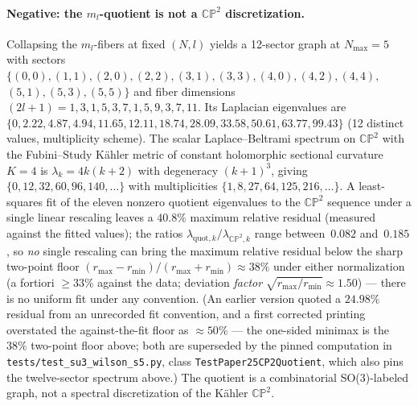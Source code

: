 \documentclass[aps,pra,twocolumn,superscriptaddress,longbibliography]{revtex4-2}
\begin{document}
\paragraph*{Negative: the $m_l$-quotient is not a $\mathbb{CP}^2$
discretization.} Collapsing the $m_l$-fibers at fixed $(N, l)$
yields a 12-sector graph at $N_{\max} = 5$ with sectors
$\{(0,0), (1,1), (2,0), (2,2), (3,1), (3,3), (4,0), (4,2), (4,4),$
$(5,1), (5,3), (5,5)\}$ and fiber dimensions $(2l+1) = 1, 3, 1, 5,
3, 7, 1, 5, 9, 3, 7, 11$.  Its Laplacian eigenvalues are
$\{0, 2.22, 4.87, 4.94, 11.65, 12.11, 18.74, 28.09, 33.58, 50.61,
63.77, 99.43\}$ (12 distinct values, multiplicity scheme).  The
scalar Laplace--Beltrami spectrum on $\mathbb{CP}^2$ with the
Fubini--Study K\"ahler metric of constant holomorphic sectional
curvature~$K = 4$ is
$\lambda_k = 4k(k+2)$ with degeneracy $(k+1)^3$, giving
$\{0, 12, 32, 60, 96, 140, \ldots\}$ with multiplicities
$\{1, 8, 27, 64, 125, 216, \ldots\}$.  A least-squares fit of the
eleven nonzero quotient eigenvalues to the $\mathbb{CP}^2$ sequence
under a single linear rescaling leaves a $40.8\%$ maximum relative
residual (measured against the fitted values); the ratios
$\lambda_{\text{quot},k} / \lambda_{\mathbb{CP}^2, k}$ range
between~$0.082$ and~$0.185$, so \emph{no} single rescaling can bring
the maximum relative residual below the sharp two-point floor
$(r_{\max} - r_{\min})/(r_{\max} + r_{\min}) \approx 38\%$ under
either normalization (a fortiori ${\geq}33\%$ against the data;
deviation \emph{factor} $\sqrt{r_{\max}/r_{\min}} \approx 1.50$) ---
there is no uniform fit under any convention.  (An earlier version
quoted a $24.98\%$ residual from an unrecorded fit convention, and a
first corrected printing overstated the against-the-fit floor as
${\approx}50\%$ --- the one-sided minimax is the $38\%$ two-point
floor above; both are superseded by the pinned computation in
\texttt{tests/test\_su3\_wilson\_s5.py}, class
\texttt{TestPaper25CP2Quotient}, which also pins the twelve-sector
spectrum above.)  The quotient is a
combinatorial SO(3)-labeled graph, not a spectral discretization
of the Kähler $\mathbb{CP}^2$.
\end{document}
